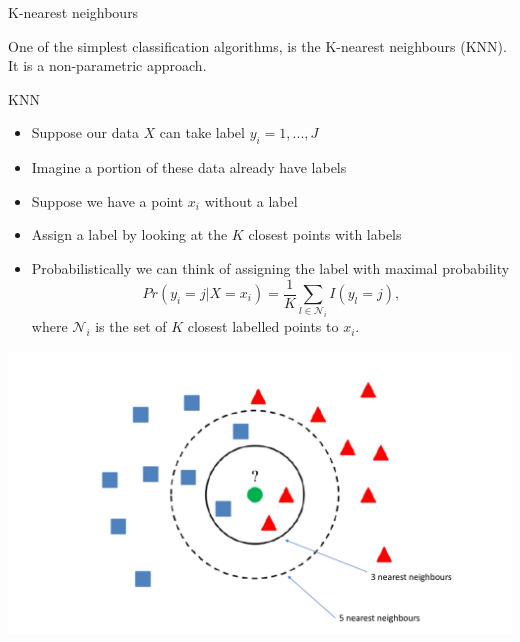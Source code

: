 \documentclass{bredelebeamer}
\begin{document}
\begin{frame}{K-nearest neighbours}

One of the simplest classification algorithms, is the K-nearest neighbours (KNN). It is a non-parametric approach.
\begin{exampleblock}{KNN}
	
	\begin{itemize}
		
		\item Suppose our data $X$ can take label $y_i = 1,..., J$
		\item Imagine a portion of these data already have labels
		\item Suppose we have a point $x_i$ without a label
		\item Assign a label by looking at the $K$ closest points with labels
		\item Probabilistically we can think of assigning the label with maximal probability
		\begin{equation}
		Pr(y_i = j|X = x_i) = \frac{1}{K}\sum_{l \in \mathcal{N}_i}I(y_l = j),
		\end{equation}
		where $\mathcal{N}_i$ is the set of $K$ closest labelled points to $x_i$.
		
	\end{itemize}
\end{exampleblock}

\end{frame}



\begin{frame}

\includegraphics[width = 1\textwidth]{knn}

\end{frame}
\end{document}
